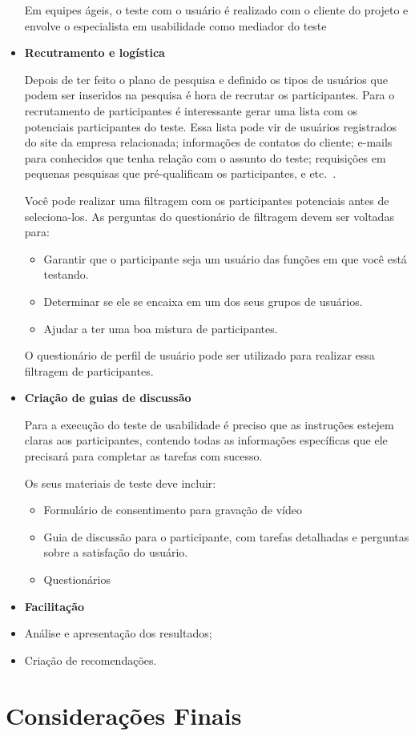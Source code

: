 \begin{itemize}
	Em equipes ágeis, o teste com o usuário é realizado com o cliente do projeto e envolve o especialista em usabilidade como mediador do teste ~\cite{santos2012}

\item \textbf{Recutramento e logística}

Depois de ter feito o plano de pesquisa e definido os tipos de usuários que podem ser inseridos na pesquisa é hora de recrutar os participantes.
Para o recrutamento de participantes é interessante gerar uma lista com os potenciais participantes do teste. Essa lista pode vir de usuários registrados do site da empresa relacionada; informações de contatos do cliente; e-mails para conhecidos que tenha relação com o assunto do teste; requisições em pequenas pesquisas que pré-qualificam os participantes, e etc.~\cite{unger2009}.

Você pode realizar uma filtragem com os participantes potenciais antes de seleciona-los. As perguntas do questionário de filtragem devem ser voltadas para:

	\begin{itemize}
	\item Garantir que o participante seja um usuário das funções em que você está testando.
	\item Determinar se ele se encaixa em um dos seus grupos de usuários.
	\item Ajudar a ter uma boa mistura de participantes.
	\end{itemize}

O questionário de perfil de usuário pode ser utilizado para realizar essa filtragem de participantes.


\item \textbf{Criação de guias de discussão}

Para a execução do teste de usabilidade é preciso que as instruções estejem claras aos participantes, contendo todas as informações específicas que ele precisará para completar as tarefas com sucesso.

Os seus materiais de teste deve incluir:

	\begin{itemize}
		\item Formulário de consentimento para gravação de vídeo
		\item Guia de discussão para o participante, com tarefas detalhadas e perguntas sobre a satisfação do usuário.
		\item Questionários
	\end{itemize}

\item \textbf{Facilitação}

\item Análise e apresentação dos resultados;
\item Criação de recomendações.

\end{itemize}


	 

\section{Considerações Finais}


	




